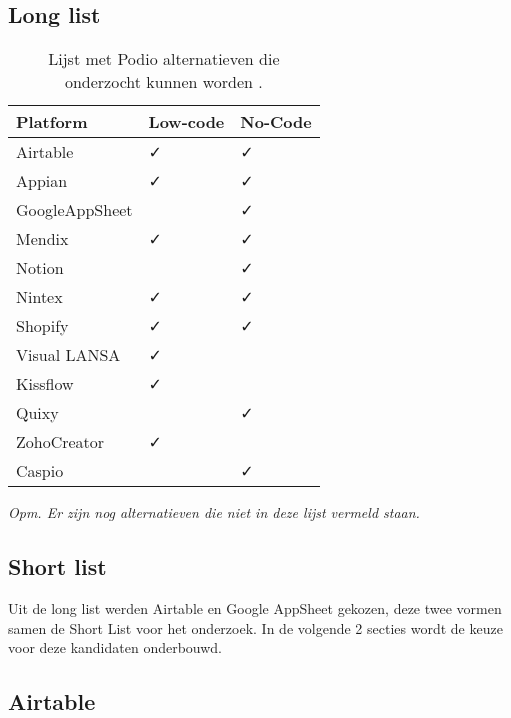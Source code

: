 \subsection{Long list}
\begin{table}[ht]
    \centering
    \caption{\label{tab:Tabel 3} Lijst met Podio alternatieven die onderzocht kunnen worden \autocite{Tasmia2022}.}
    \begin{tabular}{ | p{5cm} | p{2cm} | p{2cm} | }
        \hline
        \textbf{Platform}   & \textbf{Low-code} & \textbf{No-Code} \\
        \hline\hline
        Airtable            & ✓ & ✓ \\
        Appian              & ✓ & ✓ \\
        GoogleAppSheet      &    & ✓ \\
        Mendix              & ✓ & ✓ \\
        Notion              &    & ✓ \\
        Nintex              & ✓ & ✓ \\
        Shopify             & ✓ & ✓ \\
        Visual LANSA        & ✓ &    \\
        Kissflow            & ✓ &    \\
        Quixy               &    & ✓ \\
        ZohoCreator         & ✓ &    \\
        Caspio              &    & ✓ \\
        \hline
    \end{tabular}
    
    {\raggedright \textit{Opm. Er zijn nog alternatieven die niet in deze lijst vermeld staan.} \par}
\end{table}

\subsection{Short list}

Uit de long list werden Airtable en Google AppSheet gekozen, deze twee vormen samen de Short List voor het onderzoek. In de volgende 2 secties wordt de keuze voor deze kandidaten onderbouwd. 

\subsection{Airtable} %


